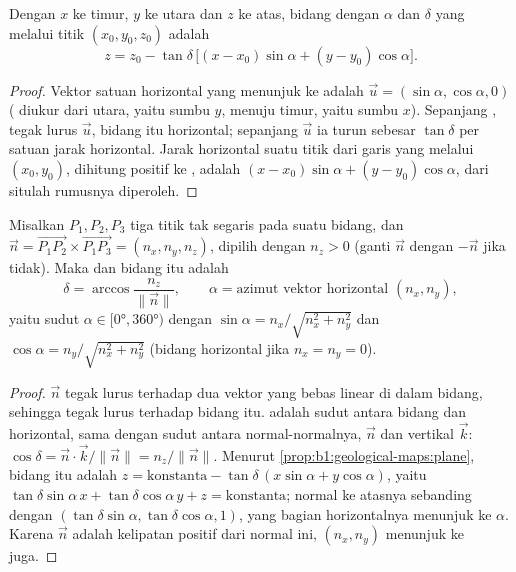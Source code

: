 \begin{proposition}\label{prop:b1:geological-maps:plane}
Dengan $x$ ke timur, $y$ ke utara dan $z$ ke atas, bidang dengan  $\alpha$ dan  $\delta$ yang melalui titik $(x_0, y_0, z_0)$ adalah
\[
  z = z_0 - \tan\delta\,\bigl[(x - x_0)\sin\alpha + (y - y_0)\cos\alpha\bigr].
\]
\end{proposition}

\begin{proof}
Vektor satuan horizontal yang menunjuk ke  adalah
$\vec u = (\sin\alpha, \cos\alpha, 0)$ ( diukur dari utara, yaitu sumbu $y$, menuju timur, yaitu sumbu $x$). Sepanjang , tegak lurus $\vec u$, bidang itu horizontal; sepanjang $\vec u$ ia turun sebesar $\tan\delta$ per satuan jarak horizontal. Jarak horizontal suatu titik dari garis  yang melalui $(x_0, y_0)$, dihitung positif ke , adalah $(x-x_0)\sin\alpha + (y-y_0)\cos\alpha$, dari situlah rumusnya diperoleh.
\end{proof}

\begin{theorem}\label{thm:b1:geological-maps:three-point}
Misalkan $P_1, P_2, P_3$ tiga titik tak segaris pada suatu bidang, dan
$\vec n = \overrightarrow{P_1P_2} \times \overrightarrow{P_1P_3} =
(n_x, n_y, n_z)$, dipilih dengan $n_z > 0$ (ganti $\vec n$ dengan $-\vec n$
jika tidak). Maka  dan  bidang itu adalah
\[
  \delta = \arccos\frac{n_z}{\|\vec n\|}, \qquad
  \alpha = \text{azimut vektor horizontal } (n_x, n_y),
\]
yaitu sudut $\alpha \in [\ang{0}, \ang{360})$ dengan
$\sin\alpha = n_x/\sqrt{n_x^2+n_y^2}$ dan $\cos\alpha = n_y/\sqrt{n_x^2+n_y^2}$
(bidang horizontal jika $n_x = n_y = 0$).
\end{theorem}

\begin{proof}
$\vec n$ tegak lurus terhadap dua vektor yang bebas linear di dalam bidang, sehingga tegak lurus terhadap bidang itu.  adalah sudut antara bidang dan horizontal, sama dengan sudut antara normal-normalnya, $\vec n$ dan vertikal $\vec k$: $\cos\delta = \vec n \cdot \vec k / \|\vec n\| = n_z/\|\vec n\|$.
Menurut \cref{prop:b1:geological-maps:plane}, bidang itu adalah $z = \text{konstanta} -
\tan\delta\,(x\sin\alpha + y\cos\alpha)$, yaitu
$\tan\delta\sin\alpha\,x + \tan\delta\cos\alpha\,y + z = \text{konstanta}$; normal ke atasnya sebanding dengan $(\tan\delta\sin\alpha,
\tan\delta\cos\alpha, 1)$, yang bagian horizontalnya menunjuk ke 
$\alpha$. Karena $\vec n$ adalah kelipatan positif dari normal ini, $(n_x, n_y)$
menunjuk ke  juga.
\end{proof}

